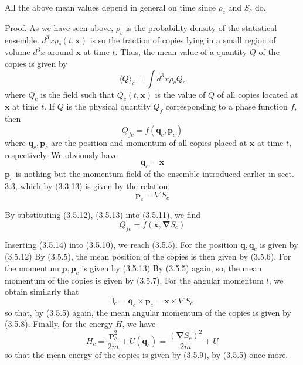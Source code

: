 \documentclass{article}
\begin{document}
All the above mean values depend in general on time since $\rho_{c}$ and $S_{c}$ do.

Proof. As we have seen above, $\rho_{c}$ is the probability density of the statistical ensemble. $d^{3} x \rho_{c}(t, \boldsymbol{x})$ is so the fraction of copies lying in a small region of volume $d^{3} x$ around $\boldsymbol{x}$ at time $t$. Thus, the mean value of a quantity $Q$ of the copies is given by
$$
\begin{equation*}
\langle Q\rangle_{c}=\int d^{3} x \rho_{c} Q_{c} \tag{3.5.10}
\end{equation*}
$$
where $Q_{c}$ is the field such that $Q_{c}(t, \boldsymbol{x})$ is the value of $Q$ of all copies located at $\boldsymbol{x}$ at time $t$. If $Q$ is the physical quantity $Q_{f}$ corresponding to a phase function $f$, then
$$
\begin{equation*}
Q_{f c}=f\left(\boldsymbol{q}_{c}, \boldsymbol{p}_{c}\right) \tag{3.5.11}
\end{equation*}
$$
where $\boldsymbol{q}_{c}, \boldsymbol{p}_{c}$ are the position and momentum of all copies placed at $\boldsymbol{x}$ at time $t$, respectively. We obviously have
$$
\begin{equation*}
\boldsymbol{q}_{c}=\boldsymbol{x} \tag{3.5.12}
\end{equation*}
$$
$\boldsymbol{p}_{c}$ is nothing but the momentum field of the ensemble introduced earlier in sect. 3.3, which by (3.3.13) is given by the relation
$$
\begin{equation*}
\boldsymbol{p}_{c}=\nabla S_{c} \tag{3.5.13}
\end{equation*}
$$

By substituting (3.5.12), (3.5.13) into (3.5.11), we find
$$
\begin{equation*}
Q_{f c}=f\left(\boldsymbol{x}, \boldsymbol{\nabla} S_{c}\right) \tag{3.5.14}
\end{equation*}
$$

Inserting (3.5.14) into (3.5.10), we reach (3.5.5).
For the position $\boldsymbol{q}, \boldsymbol{q}_{c}$ is given by (3.5.12) By (3.5.5), the mean position of the copies is then given by (3.5.6). For the momentum $\boldsymbol{p}, \boldsymbol{p}_{c}$ is given by (3.5.13) By (3.5.5) again, so, the mean momentum of the copies is given by (3.5.7). For the angular momentum $l$, we obtain similarly that
$$
\begin{equation*}
\boldsymbol{l}_{c}=\boldsymbol{q}_{c} \times \boldsymbol{p}_{c}=\boldsymbol{x} \times \nabla S_{c} \tag{3.5.15}
\end{equation*}
$$
so that, by (3.5.5) again, the mean angular momentum of the copies is given by (3.5.8). Finally, for the energy $H$, we have
$$
\begin{equation*}
H_{c}=\frac{\boldsymbol{p}_{c}^{2}}{2 m}+U\left(\boldsymbol{q}_{c}\right)=\frac{\left(\boldsymbol{\nabla} S_{c}\right)^{2}}{2 m}+U \tag{3.5.16}
\end{equation*}
$$
so that the mean energy of the copies is given by (3.5.9), by (3.5.5) once more.
\end{document}
